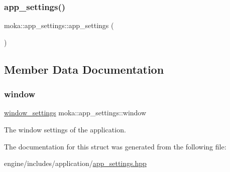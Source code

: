 \subsubsection{\texorpdfstring{app\_settings()}{app\_settings()}}
{\footnotesize\ttfamily moka\+::app\+\_\+settings\+::app\+\_\+settings (\begin{DoxyParamCaption}{ }\end{DoxyParamCaption})}



\subsection{Member Data Documentation}
\mbox{\label{structmoka_1_1app__settings_a0eb275d37ec4c67aea36de8a5d8d8823}} 
\subsubsection{\texorpdfstring{window}{window}}
{\footnotesize\ttfamily \mbox{\hyperlink{structmoka_1_1window__settings}{window\+\_\+settings}} moka\+::app\+\_\+settings\+::window}



The window settings of the application. 



The documentation for this struct was generated from the following file\+:\begin{DoxyCompactItemize}
\item 
engine/includes/application/\mbox{\hyperlink{app__settings_8hpp}{app\+\_\+settings.\+hpp}}\end{DoxyCompactItemize}
